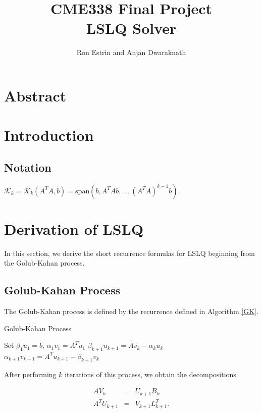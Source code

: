 \documentclass[11pt]{article}
\newcommand{\KK}{\mathcal{K}_k}
\begin{document}
\title{CME338 Final Project\\
LSLQ Solver }
\author{Ron Estrin and Anjan Dwaraknath}
\date{}
\maketitle

\section{Abstract}

\section{Introduction}
\subsection{Notation}
$\KK = \KK (A^T A, b) = \mathrm{span}\left(b, A^T A b, \dots, (A^T A)^{k-1} b \right)$.

\section{Derivation of LSLQ}
In this section, we derive the short recurrence formulas for LSLQ beginning from the Golub-Kahan process.

\subsection{Golub-Kahan Process}
The Golub-Kahan process is defined by the recurrence defined in Algorithm \ref{GK}.

\begin{algorithm}
\caption{Golub-Kahan Process}
\label{GK}
\begin{algorithmic}
	\State Set $\beta_1 u_1 = b$, $\alpha_1 v_1 = A^T u_1$
		\State $\beta_{k+1} u_{k+1} = A v_k - \alpha_k u_k$
		\State $\alpha_{k+1} v_{k+1} = A^T u_{k+1} - \beta_{k+1} v_k$
	\EndFor
\end{algorithmic}
\end{algorithm}

After performing $k$ iterations of this process, we obtain the decompositions

\begin{eqnarray}
\label{GKdcmp1}
A V_k &=& U_{k+1} B_k \\
\label{GKdcmp2}
A^T U_{k+1} &=& V_{k+1} L^T_{k+1}.
\end{eqnarray}
\end{document}
